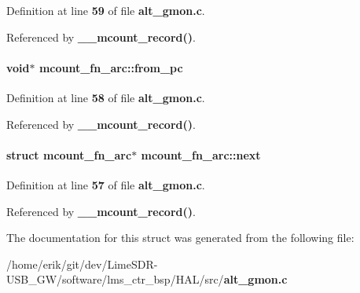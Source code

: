 Definition at line {\bf 59} of file {\bf alt\+\_\+gmon.\+c}.



Referenced by {\bf \+\_\+\+\_\+mcount\+\_\+record()}.

\paragraph[{from\+\_\+pc}]{\setlength{\rightskip}{0pt plus 5cm}void$\ast$ mcount\+\_\+fn\+\_\+arc\+::from\+\_\+pc}\label{structmcount__fn__arc_ae055fdd77d49a1aca27498a72f740b47}


Definition at line {\bf 58} of file {\bf alt\+\_\+gmon.\+c}.



Referenced by {\bf \+\_\+\+\_\+mcount\+\_\+record()}.

\paragraph[{next}]{\setlength{\rightskip}{0pt plus 5cm}struct {\bf mcount\+\_\+fn\+\_\+arc}$\ast$ mcount\+\_\+fn\+\_\+arc\+::next}\label{structmcount__fn__arc_a7feed02654f6f0c430718b9e8c84675a}


Definition at line {\bf 57} of file {\bf alt\+\_\+gmon.\+c}.



Referenced by {\bf \+\_\+\+\_\+mcount\+\_\+record()}.



The documentation for this struct was generated from the following file\+:\begin{DoxyCompactItemize}
\item 
/home/erik/git/dev/\+Lime\+S\+D\+R-\/\+U\+S\+B\+\_\+\+G\+W/software/lms\+\_\+ctr\+\_\+bsp/\+H\+A\+L/src/{\bf alt\+\_\+gmon.\+c}\end{DoxyCompactItemize}
